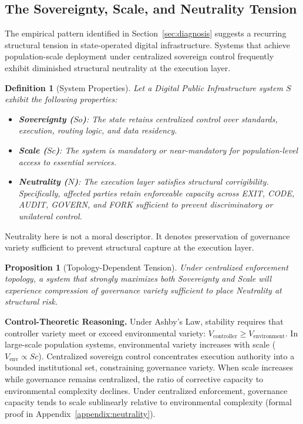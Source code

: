 \documentclass{article}
\newtheorem{definition}{Definition}[section]
\newtheorem{proposition}{Proposition}[section]
\begin{document}
\subsection{The Sovereignty, Scale, and Neutrality Tension}
\label{subsec:trilemma}

The empirical pattern identified in Section~\ref{sec:diagnosis} suggests a recurring structural tension in state-operated digital infrastructure. Systems that achieve population-scale deployment under centralized sovereign control frequently exhibit diminished structural neutrality at the execution layer.

\begin{definition}[System Properties]
Let a Digital Public Infrastructure system $S$ exhibit the following properties:
\begin{itemize}[noitemsep]
    \item \textbf{Sovereignty ($So$)}: The state retains centralized control over standards, execution, routing logic, and data residency.
    \item \textbf{Scale ($Sc$)}: The system is mandatory or near-mandatory for population-level access to essential services.
    \item \textbf{Neutrality ($N$)}: The execution layer satisfies structural corrigibility. Specifically, affected parties retain enforceable capacity across EXIT, CODE, AUDIT, GOVERN, and FORK sufficient to prevent discriminatory or unilateral control.
\end{itemize}
\end{definition}

Neutrality here is not a moral descriptor. It denotes preservation of governance variety sufficient to prevent structural capture at the execution layer.

\begin{proposition}[Topology-Dependent Tension]
\label{prop:trilemma}
Under centralized enforcement topology, a system that strongly maximizes both Sovereignty and Scale will experience compression of governance variety sufficient to place Neutrality at structural risk.
\end{proposition}

\textbf{Control-Theoretic Reasoning.} Under Ashby's Law, stability requires that controller variety meet or exceed environmental variety: $V_{\text{controller}} \geq V_{\text{environment}}$. In large-scale population systems, environmental variety increases with scale ($V_{\text{env}} \propto Sc$). Centralized sovereign control concentrates execution authority into a bounded institutional set, constraining governance variety. When scale increases while governance remains centralized, the ratio of corrective capacity to environmental complexity declines. Under centralized enforcement, governance capacity tends to scale sublinearly relative to environmental complexity (formal proof in Appendix~\ref{appendix:neutrality}).
\end{document}
